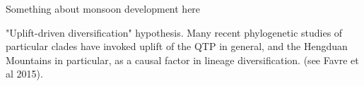 Something about monsoon development here




"Uplift-driven diversification" hypothesis. Many recent phylogenetic studies of particular clades have invoked uplift of the QTP in general, and the Hengduan Mountains in particular, as a causal factor in lineage diversification. (see Favre et al 2015).

